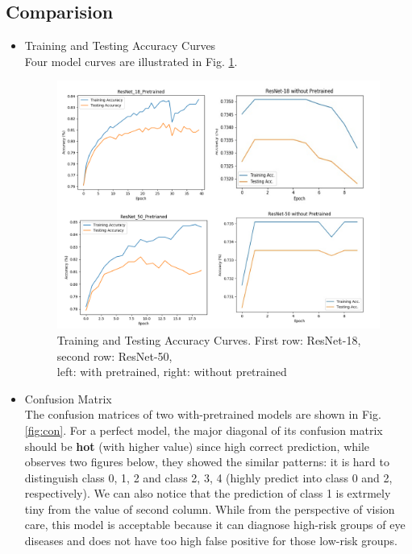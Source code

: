 \documentclass[12pt,a4paper]{article}
\begin{document}
\subsection{Comparision} 
\begin{itemize} 
\item{Training and Testing Accuracy Curves} \\
Four model curves are illustrated in Fig. \ref{fig:result}.
\begin{figure}[hbt]
\centering
  \includegraphics[scale=0.3]{result.png}
  \caption{Training and Testing Accuracy Curves. First row: ResNet-18, second row: ResNet-50, \\ left: with pretrained, right: without pretrained}
  \label{fig:result}
\end{figure}
\item{Confusion Matrix} \\
The confusion matrices of two with-pretrained models are shown in Fig. \ref{fig:con}. For a perfect model, the major diagonal of its confusion matrix should be \textbf{hot} (with higher value) since high correct prediction, while observes two figures below, they showed the similar patterns: it is hard to distinguish class 0, 1, 2 and class 2, 3, 4 (highly predict into class 0 and 2, respectively). We can also notice that the prediction of class 1 is extrmely tiny from the value of second column. While from the perspective of vision care, this model is acceptable because it can diagnose high-risk groups of eye diseases and does not have too high false positive for those low-risk groups. 
\begin{figure}[hbt]

\end{figure}
\end{itemize}
\end{document}
